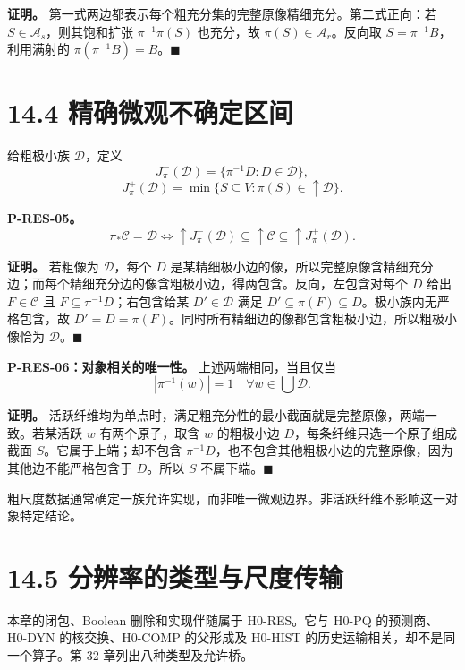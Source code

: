\documentclass[
  11pt,
  oneside]{book}
\begin{document}
\textbf{证明。} 第一式两边都表示每个粗充分集的完整原像精细充分。第二式正向：若 \(S\in\mathcal A_s\)，则其饱和扩张 \(\pi^{-1}\pi(S)\) 也充分，故 \(\pi(S)\in\mathcal A_r\)。反向取 \(S=\pi^{-1}B\)，利用满射的 \(\pi(\pi^{-1}B)=B\)。\(\blacksquare\)

\section{14.4 精确微观不确定区间}\label{ux7cbeux786eux5faeux89c2ux4e0dux786eux5b9aux533aux95f4}

给粗极小族 \(\mathcal D\)，定义 \[J^-_\pi(\mathcal D)=\{\pi^{-1}D:D\in\mathcal D\},\] \[J^+_\pi(\mathcal D)=
\min\{S\subseteq V:\pi(S)\in\uparrow\mathcal D\}.\]

\hypertarget{p-res-05}{}\label{p-res-05}

\textbf{P-RES-05。} \[\pi_*\mathcal C=\mathcal D
\iff
\uparrow J^-_\pi(\mathcal D)
\subseteq\uparrow\mathcal C
\subseteq\uparrow J^+_\pi(\mathcal D).\]

\textbf{证明。} 若粗像为 \(\mathcal D\)，每个 \(D\) 是某精细极小边的像，所以完整原像含精细充分边；而每个精细充分边的像含粗极小边，得两包含。反向，左包含对每个 \(D\) 给出 \(F\in\mathcal C\) 且 \(F\subseteq\pi^{-1}D\)；右包含给某 \(D'\in\mathcal D\) 满足 \(D'\subseteq\pi(F)\subseteq D\)。极小族内无严格包含，故 \(D'=D=\pi(F)\)。同时所有精细边的像都包含粗极小边，所以粗极小像恰为 \(\mathcal D\)。\(\blacksquare\)

\hypertarget{p-res-06}{}\label{p-res-06}

\textbf{P-RES-06：对象相关的唯一性。} 上述两端相同，当且仅当 \[|\pi^{-1}(w)|=1
\quad\forall w\in\bigcup\mathcal D.\]

\textbf{证明。} 活跃纤维均为单点时，满足粗充分性的最小截面就是完整原像，两端一致。若某活跃 \(w\) 有两个原子，取含 \(w\) 的粗极小边 \(D\)，每条纤维只选一个原子组成截面 \(S\)。它属于上端；却不包含 \(\pi^{-1}D\)，也不包含其他粗极小边的完整原像，因为其他边不能严格包含于 \(D\)。所以 \(S\) 不属下端。\(\blacksquare\)

粗尺度数据通常确定一族允许实现，而非唯一微观边界。非活跃纤维不影响这一对象特定结论。

\section{14.5 分辨率的类型与尺度传输}\label{ux5206ux8fa8ux7387ux7684ux7c7bux578bux4e0eux5c3aux5ea6ux4f20ux8f93}

本章的闭包、Boolean 删除和实现伴随属于 H0-RES。它与 H0-PQ 的预测商、H0-DYN 的核交换、H0-COMP 的父形成及 H0-HIST 的历史运输相关，却不是同一个算子。第 32 章列出八种类型及允许桥。
\end{document}
